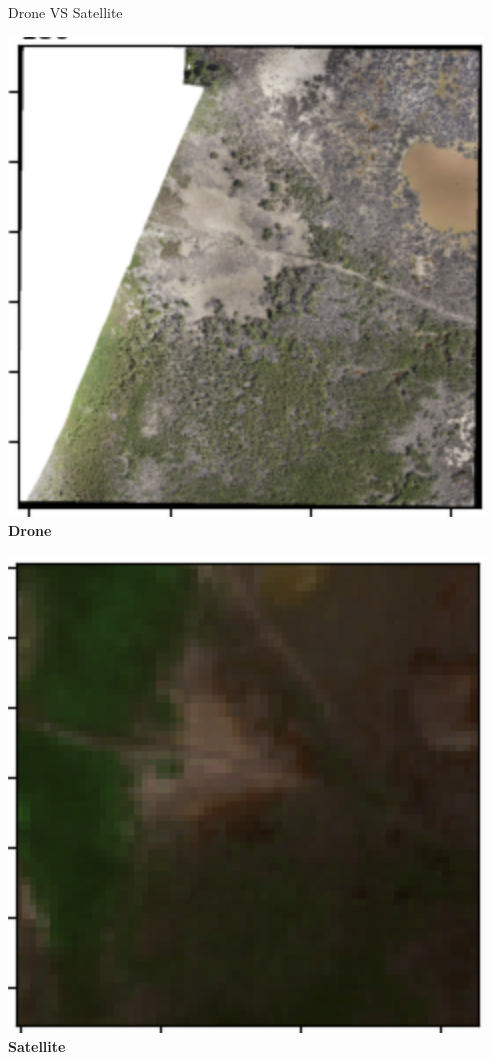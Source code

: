 \begin{frame}{Drone VS Satellite}
  \centering
  \begin{minipage}{0.48\textwidth}
    \centering
    \includegraphics[width=\textwidth,keepaspectratio]{images/chunk-tif.png}
    \textbf{Drone}
  \end{minipage}
  \hfill
  \begin{minipage}{0.48\textwidth}
    \centering
    \includegraphics[width=\textwidth,keepaspectratio]{images/satellite-tif.png}
    \textbf{Satellite}
  \end{minipage}
\end{frame}

